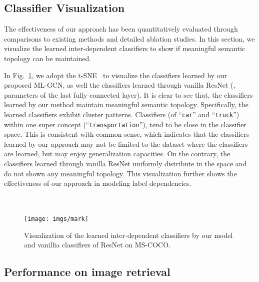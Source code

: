 \documentclass[10pt,twocolumn,letterpaper]{article}
\begin{document}
\subsection{Classifier Visualization}

The effectiveness of our approach has been quantitatively evaluated through comparisons to existing methods and detailed ablation studies. In this section, we visualize the learned inter-dependent classifiers to show if meaningful semantic topology can be maintained. 





In Fig.~\ref{fig:classifier}, we adopt the t-SNE~\cite{tsen} to visualize the classifiers learned by our proposed ML-GCN, as well the classifiers learned through vanilla ResNet (\ie, parameters of the last fully-connected layer). It is clear to see that, the classifiers learned by our method maintain meaningful semantic topology. Specifically, the learned classifiers exhibit cluster patterns. Classifiers (of ``\texttt{car}'' and ``\texttt{truck}'') within one super concept (``\texttt{transportation}''), tend to be close in the classifier space. This is consistent with common sense, which indicates that the classifiers learned by our approach may not be limited to the dataset where the classifiers are learned, but may enjoy generalization capacities. On the contrary, the classifiers learned through vanilla ResNet uniformly distribute in the space and do not shown any meaningful topology. This visualization further shows the effectiveness of our approach in modeling label dependencies.



\begin{figure}[h!]
	\centering
	\\
	\\
	\texttt{[image: imgs/mark]}
	\caption{Visualization of the learned inter-dependent classifiers by our model and vanillia classifiers of ResNet on MS-COCO.}
	\vspace{-0.5em}
	\label{fig:classifier}
	\vspace{0cm}
\end{figure}

\subsection{Performance on image retrieval}
\end{document}
